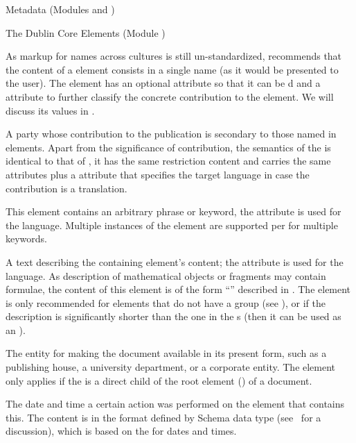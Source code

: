 \begin{tchapter}[id=metadata,short=Metadata]{Metadata (Modules {} and  {})}
\begin{tsection}[id=dc-elements]{The Dublin Core Elements (Module {})}
\begin{description}
  As markup for names across cultures is still un-standardized, {\omdoc} recommends that
  the content of a {} element consists in a single name (as it
  would be presented to the user). The {} element has an
  optional attribute {} so that it can be
  {d} and a {} attribute to further
  classify the concrete contribution to the element. We will discuss its values in
  {}.
\item[{\element[ns-elt=dc]{contributor}}] A party whose contribution to the publication is
  secondary to those named in {} elements.  Apart from the
  significance of contribution, the semantics of the {} is
  identical to that of {}, it has the same restriction content
  and carries the same attributes plus a
  {} attribute that specifies the
  target language in case the contribution is a translation.
\item[{\element[ns-elt=dc]{subject}}] This element contains an arbitrary phrase or keyword,
  the attribute {} is used for the
  language. Multiple instances of the {} element are supported
  per {} for multiple keywords.
\item[{\element[ns-elt=dc]{description}}] A text describing the containing element's
  content; the attribute {} is used
  for the language. As description of mathematical objects or {\omdoc} fragments may
  contain formulae, the content of this element is of the form
  ``{}'' described in {}.  The
  {} element is only recommended for {}
  elements that do not have a {} group (see {}), or if the
  description is significantly shorter than the one in the {s} (then it can
  be used as an {}).
\item[{\element[ns-elt=dc]{publisher}}] The entity for making the document available in
  its present form, such as a publishing house, a university department, or a corporate
  entity. The {} element only applies if the
  {} is a direct child of the root element ({}) of a
  document.
\item[{\element[ns-elt=dc]{date}}] The date and time a certain action was performed on the
  element that contains this. The content is in the format defined by {\xml} Schema data
  type {} (see~\cite{BirMal:XMLSchema:Datatypes} for a discussion),
  which is based on the {} for dates and times.


\end{description}
\end{tsection}
\end{tchapter}

